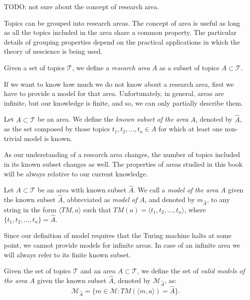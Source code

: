 {\color{red} TODO: not sure about the concept of research area.}

Topics can be grouped into research areas. The concept of area is useful as long as all the topics included in the area share a common property. The particular details of grouping properties depend on the practical applications in which the theory of nescience is being used.

\begin{definition}
Given a set of topics $\mathcal{T}$, we define a \emph{research area} $A$ as a subset of topics $A \subset \mathcal{T}$.
\end{definition}

If we want to know how much we do not know about a research area, first we have to provide a model for that area. Unfortunately, in general, areas are infinite, but our knowledge is finite, and so, we can only partially describe them.

\begin{definition}
Let $A \subset \mathcal{T}$ be an area. We define the \emph{known subset of the area} $A$, denoted by $\hat{A}$, as the set composed by those topics $t_1, t_2, \ldots, t_n \in A$ for which at least one non-trivial model is known.
\end{definition}

As our understanding of a research area changes, the number of topics included in its known subset changes as well. The properties of areas studied in this book will be always relative to our current knowledge.

\begin{definition}
Let $A \subset \mathcal{T}$ be an area with known subset $\hat{A}$. We call a \emph{model of the area $A$} given the known subset $\hat{A}$, abbreviated as \emph{model of $A$}, and denoted by $m_{\hat{A}}$, to any string in the form $\langle TM, a\rangle$ such that $TM(a) = \langle t_1, t_2, \ldots, t_n\rangle$, where $\{t_1, t_2, \ldots, t_n\} = \hat{A}$.
\end{definition}

Since our definition of model requires that the Turing machine halts at some point, we cannot provide models for infinite areas. In case of an infinite area we will always refer to its finite known subset.

\begin{definition}
Given the set of topics $\mathcal{T}$ and an area $A \subset \mathcal{T}$, we define the set of \emph{valid models of the area $A$} given the known subset $\hat{A}$, denoted by $\mathcal{M}_{\hat{A}}$, as:
\[
\mathcal{M}_{\hat{A}} = \{ m \in \mathcal{M} : TM \left(\langle m, a \rangle \right) = \hat{A} \}.
\]
\end{definition}

